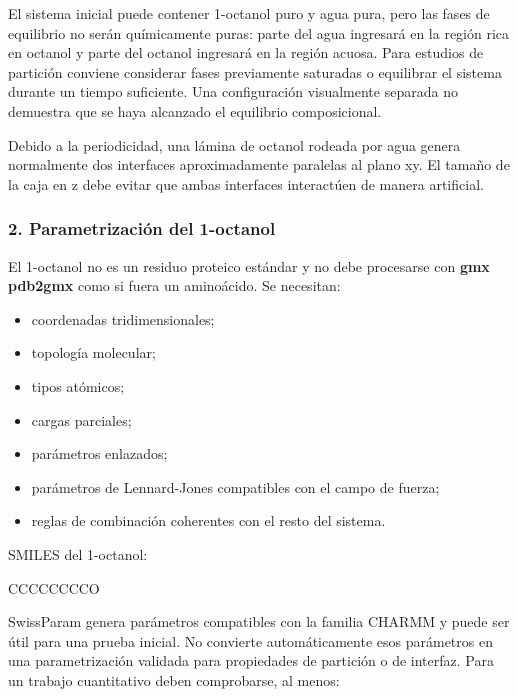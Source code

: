\documentclass[
  spanish,
  11pt,
  a4paper]{article}
\newenvironment{Shaded}{\begin{snugshade}}{\end{snugshade}}
\newcommand{\NormalTok}[1]{#1}
\providecommand{\tightlist}{%
  \setlength{\itemsep}{0pt}\setlength{\parskip}{0pt}}
\begin{document}
El sistema inicial puede contener 1-octanol puro y agua pura, pero las
fases de equilibrio no serán químicamente puras: parte del agua
ingresará en la región rica en octanol y parte del octanol ingresará en
la región acuosa. Para estudios de partición conviene considerar fases
previamente saturadas o equilibrar el sistema durante un tiempo
suficiente. Una configuración visualmente separada no demuestra que se
haya alcanzado el equilibrio composicional.

Debido a la periodicidad, una lámina de octanol rodeada por agua genera
normalmente dos interfaces aproximadamente paralelas al plano xy. El
tamaño de la caja en z debe evitar que ambas interfaces interactúen de
manera artificial.

\subsubsection{2. Parametrización del
1-octanol}\label{parametrizaciuxf3n-del-1-octanol}

El 1-octanol no es un residuo proteico estándar y no debe procesarse con
\textbf{gmx pdb2gmx} como si fuera un aminoácido. Se necesitan:

\begin{itemize}
\tightlist
\item
  coordenadas tridimensionales;
\item
  topología molecular;
\item
  tipos atómicos;
\item
  cargas parciales;
\item
  parámetros enlazados;
\item
  parámetros de Lennard-Jones compatibles con el campo de fuerza;
\item
  reglas de combinación coherentes con el resto del sistema.
\end{itemize}

SMILES del 1-octanol:

\begin{Shaded}
\begin{Highlighting}[]
\NormalTok{CCCCCCCCO}
\end{Highlighting}
\end{Shaded}

SwissParam genera parámetros compatibles con la familia CHARMM y puede
ser útil para una prueba inicial. No convierte automáticamente esos
parámetros en una parametrización validada para propiedades de partición
o de interfaz. Para un trabajo cuantitativo deben comprobarse, al menos:
\end{document}
